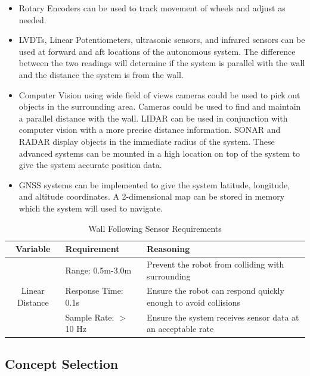 \documentclass[12pt]{article}
\begin{document}
\begin{itemize}
\item Rotary Encoders can be used to track movement of wheels and adjust as needed.
\item LVDTs, Linear Potentiometers, ultrasonic sensors, and infrared sensors can be used at forward and aft locations of the autonomous system. The difference between the two readings will determine if the system is parallel with the wall and the distance the system is from the wall.
\item
Computer Vision using wide field of views cameras could be used to pick out objects in the surrounding area. Cameras could be used to find and maintain a parallel distance with the wall. LIDAR can be used in conjunction with computer vision with a more precise distance information. SONAR and RADAR display objects in the immediate radius of the system. These advanced systems can be mounted in a high location on top of the system to give the system accurate position data.
\item
GNSS systems can be implemented to give the system latitude, longitude, and altitude coordinates. A 2-dimensional map can be stored in memory which the system will used to navigate.
\end{itemize}

\begin{table}[htbp]
  \centering
  \caption{Wall Following Sensor Requirements}
    \begin{tabular}{c|p{10em}|p{29.72em}}
    \multicolumn{1}{p{6.9em}|}{\textbf{Variable}} & \textbf{Requirement} & \textbf{Reasoning} \bigstrut[b]\\
\hline
    \multicolumn{1}{c|}{\multirow{3}[1]{*}{Linear Distance}} & Range: 0.5m-3.0m & Prevent the robot from colliding with surrounding \bigstrut[t]\\
          & Response Time: 0.1s & \multicolumn{1}{l}{Ensure the robot can respond quickly enough to avoid collisions } \\
          & Sample Rate: $>$ 10 Hz & Ensure the system receives sensor data at an acceptable rate \\
    \end{tabular}%
  \label{tab:addlabel}%
\end{table}%





\subsection{Concept Selection}
\end{document}
